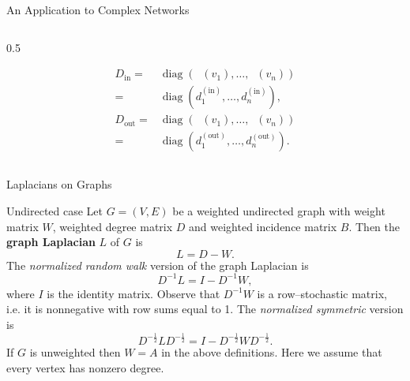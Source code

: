 \documentclass[aspectratio=169,xcolor=dvipsnames]{beamer}
\DeclareMathOperator{\degout}{\deg_{\text{out}}}
\DeclareMathOperator{\degin}{\deg_{\text{in}}}
\begin{document}
\begin{frame}{An Application to Complex Networks}
\begin{columns}
\begin{column}{0.5\columnwidth}
\begin{itemize}
	\[\begin{split}D_{\text{in}} = & \operatorname{diag}(\degin(v_1),\ldots,\degin(v_n)) \\ = &  \operatorname{diag}(d^{(\text{in})}_1,\ldots,d^{(\text{in})}_n),\\ D_{\text{out}} = & \operatorname{diag}(\degout(v_1),\ldots,\degout(v_n)) 	\\ = &   \operatorname{diag}(d^{(\text{out})}_1,\ldots,d^{(\text{out})}_n).\end{split}\]
	\end{itemize}
	\end{column}
	\end{columns}
	\end{frame}	

	\begin{frame}{Laplacians on Graphs}
	\begin{block}{Undirected case}
	        Let $G = (V,E)$ be a weighted undirected graph with weight matrix $W$,
	weighted degree matrix $D$ and weighted incidence matrix $B$. Then the \alert{\textbf{graph Laplacian}} $L$ of $G$ is\vspace{-0.5em}
	\[L = D - W.\]
	The \alert{\textit{normalized random walk}} version of the graph Laplacian is\vspace{-0.5em}
	\[D^{-1}L = I - D^{-1}W,\]
	where $I$ is the identity matrix. Observe that $D^{-1}W$ is a row--stochastic matrix, i.e. it is nonnegative with row sums equal to 1. The \alert{\textit{normalized symmetric}} version is\vspace{-0.5em}
	\[D^{-\frac{1}{2}} L D^{-\frac{1}{2}} = I - D^{-\frac{1}{2}} W D^{-\frac{1}{2}}.\]
	If $G$ is unweighted then $W=A$ in the above definitions. Here we assume that every vertex has nonzero degree.
	\end{block}
	\end{frame}
\end{document}
